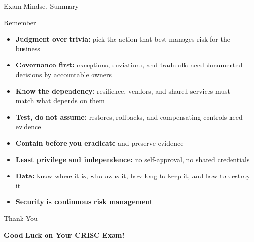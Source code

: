 \documentclass{beamer}
\begin{document}
	\begin{frame}{Exam Mindset Summary}
		\begin{block}{Remember}
			\begin{itemize}
				\item \textbf{Judgment over trivia:} pick the action that best manages risk for the business
				\item \textbf{Governance first:} exceptions, deviations, and trade-offs need documented decisions by accountable owners
				\item \textbf{Know the dependency:} resilience, vendors, and shared services must match what depends on them
				\item \textbf{Test, do not assume:} restores, rollbacks, and compensating controls need evidence
				\item \textbf{Contain before you eradicate} and preserve evidence
				\item \textbf{Least privilege and independence:} no self-approval, no shared credentials
				\item \textbf{Data:} know where it is, who owns it, how long to keep it, and how to destroy it
				\item \textbf{Security is continuous risk management}
			\end{itemize}
		\end{block}
	\end{frame}
	
	\begin{frame}{Thank You}
		\begin{center}
			{\Huge \textbf{Good Luck on Your CRISC Exam!}}
		\end{center}
	\end{frame}
	
\end{document}
